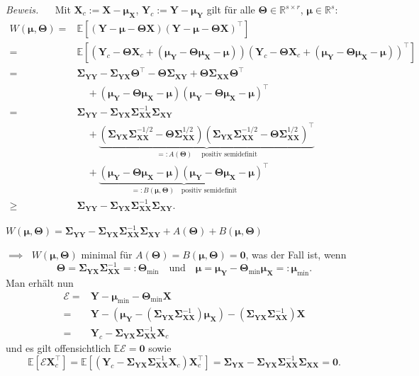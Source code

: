 \documentclass[12pt, aspectratio=169]{beamer}
\newcommand{\E}{\mathbb{E}}
\newcommand{\R}{\mathbb{R}}
\newcommand{\X}{\mathbf{X}}
\newcommand{\Y}{\mathbf{Y}}
\newcommand{\T}{\bm{\Theta}}
\newcommand{\muu}{\bm{\mu}}
\newcommand{\Ssigma}{\bm{\Sigma}}
\begin{document}
\begin{frame}
	\textit{Beweis.} $\quad$
	Mit $\X_c := \X - \muu_\X$, $\Y_c := \Y - \muu_\Y$ gilt für alle $\T \in \R^{s \times r}$, $\muu \in \R^s$:
	\begin{align*}
		W(\muu, \T) ={}& \E[(\Y - \muu - \T \X)(\Y - \muu - \T \X)^\top] \\
		={}& \E[(\Y_c - \T \X_c + (\muu_\Y - \T \muu_\X - \muu))(\Y_c - \T \X_c + (\muu_\Y - \T \muu_\X - \muu))^\top] \\
		={}& \Ssigma_{\Y\Y} - \Ssigma_{\Y\X} \T^\top - \T \Ssigma_{\X\Y} + \T \Ssigma_{\X\X} \T^\top \\
		& \quad + (\muu_\Y - \T \muu_\X - \muu)(\muu_\Y - \T \muu_\X - \muu)^\top \\
		={}& \Ssigma_{\Y\Y} - \Ssigma_{\Y\X} \Ssigma_{\X\X}^{-1} \Ssigma_{\X\Y} \\
		& \quad + \underbrace{(\Ssigma_{\Y\X} \Ssigma_{\X\X}^{-1/2} - \T \Ssigma_{\X\X}^{1/2})(\Ssigma_{\Y\X} \Ssigma_{\X\X}^{-1/2} - \T \Ssigma_{\X\X}^{1/2})^\top}_{=: A(\T) \quad \text{ positiv semidefinit}} \\
		& \quad + \underbrace{(\muu_\Y - \T \muu_\X - \muu)(\muu_\Y - \T \muu_\X - \muu)^\top}_{=:B(\muu, \T) \quad \text{positiv semidefinit}} \\
		\geq{}& \Ssigma_{\Y\Y} - \Ssigma_{\Y\X} \Ssigma_{\X\X}^{-1} \Ssigma_{\X\Y} \text{.}
	\end{align*}
\end{frame}
\begin{frame}
	\begin{alertblock}{}
		\begin{center}
			$W(\muu, \T) = \Ssigma_{\Y\Y} - \Ssigma_{\Y\X} \Ssigma_{\X\X}^{-1} \Ssigma_{\X\Y} + A(\T) + B(\muu, \T)$
		\end{center}
	\end{alertblock}
	$\implies\;$ $W(\muu, \T)$ minimal für $A(\T) = B(\muu, \T) = \mathbf{0}$, was der Fall ist, wenn
	$$ \T = \Ssigma_{\Y\X} \Ssigma_{\X\X}^{-1} =: \T_{\min} \quad \text{und} \quad \muu = \muu_\Y - \T_{\min} \muu_\X =: \muu_{\min} \text{.}$$
	Man erhält nun
	\begin{align*}
	\mathcal{E} ={}& \Y - \muu_{\min} - \T_{\min} \X \\
	={}& \Y - (\muu_\Y - (\Ssigma_{\Y\X} \Ssigma_{\X\X}^{-1}) \muu_\X) - (\Ssigma_{\Y\X} \Ssigma_{\X\X}^{-1}) \X \\
	={}& \Y_c - \Ssigma_{\Y\X} \Ssigma_{\X\X}^{-1} \X_c
	\end{align*}
	und es gilt offensichtlich $\E \mathcal{E} = \mathbf{0}$ sowie
	$$\E[\mathcal{E} \X_c^\top] = \E[(\Y_c - \Ssigma_{\Y\X} \Ssigma_{\X\X}^{-1} \X_c) \X_c^\top] = \Ssigma_{\Y\X} - \Ssigma_{\Y\X}\Ssigma_{\X\X}^{-1} \Ssigma_{\X\X} = \mathbf{0} \text{.}$$
	\hfill \qedsymbol
\end{frame}
\end{document}
